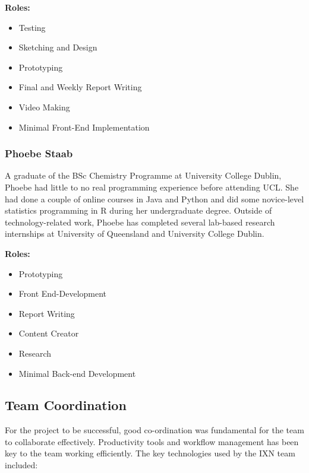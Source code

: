 \documentclass[fontsize=11pt]{extarticle}
\numberwithin{figure}{section} %
\numberwithin{table}{section}%
\providecommand{\tightlist}{%
  \setlength{\itemsep}{0pt}\setlength{\parskip}{0pt}}
\begin{document}
\textbf{Roles:}

\begin{itemize}
\tightlist
\item
  Testing
\item
  Sketching and Design
\item
  Prototyping
\item
  Final and Weekly Report Writing
\item
  Video Making
\item
  Minimal Front-End Implementation
\end{itemize}

\hypertarget{phoebe-staab}{%
\subsubsection{Phoebe Staab}\label{phoebe-staab}}

A graduate of the BSc Chemistry Programme at University College Dublin,
Phoebe had little to no real programming experience before attending
UCL. She had done a couple of online courses in Java and Python and did
some novice-level statistics programming in R during her undergraduate
degree. Outside of technology-related work, Phoebe has completed several
lab-based research internships at University of Queensland and
University College Dublin.

\textbf{Roles:}

\begin{itemize}
\tightlist
\item
  Prototyping
\item
  Front End-Development
\item
  Report Writing
\item
  Content Creator
\item
  Research
\item
  Minimal Back-end Development
\end{itemize}

\hypertarget{team-coordination}{%
\subsection{Team Coordination}\label{team-coordination}}

For the project to be successful, good co-ordination was fundamental for
the team to collaborate effectively. Productivity tools and workflow
management has been key to the team working efficiently. The key
technologies used by the IXN team included:
\end{document}
